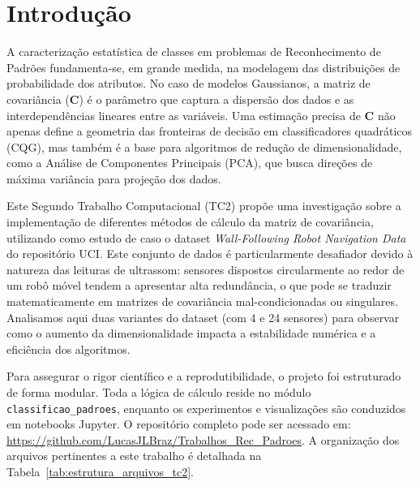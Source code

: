 \section{Introdução}
\label{cap:introducao}

A caracterização estatística de classes em problemas de Reconhecimento de Padrões fundamenta-se, em grande medida, na modelagem das distribuições de probabilidade dos atributos. No caso de modelos Gaussianos, a matriz de covariância ($\mathbf{C}$) é o parâmetro que captura a dispersão dos dados e as interdependências lineares entre as variáveis. Uma estimação precisa de $\mathbf{C}$ não apenas define a geometria das fronteiras de decisão em classificadores quadráticos (CQG), mas também é a base para algoritmos de redução de dimensionalidade, como a Análise de Componentes Principais (PCA), que busca direções de máxima variância para projeção dos dados.

Este Segundo Trabalho Computacional (TC2) propõe uma investigação sobre a implementação de diferentes métodos de cálculo da matriz de covariância, utilizando como estudo de caso o dataset \textit{Wall-Following Robot Navigation Data} do repositório UCI. Este conjunto de dados é particularmente desafiador devido à natureza das leituras de ultrassom: sensores dispostos circularmente ao redor de um robô móvel tendem a apresentar alta redundância, o que pode se traduzir matematicamente em matrizes de covariância mal-condicionadas ou singulares. Analisamos aqui duas variantes do dataset (com 4 e 24 sensores) para observar como o aumento da dimensionalidade impacta a estabilidade numérica e a eficiência dos algoritmos.

Para assegurar o rigor científico e a reprodutibilidade, o projeto foi estruturado de forma modular. Toda a lógica de cálculo reside no módulo \texttt{classificao\_padroes}, enquanto os experimentos e visualizações são conduzidos em notebooks Jupyter. O repositório completo pode ser acessado em: \url{https://github.com/LucasJLBraz/Trabalhos_Rec_Padroes}. A organização dos arquivos pertinentes a este trabalho é detalhada na Tabela~\ref{tab:estrutura_arquivos_tc2}.

\begin{table}[h!]
\centering
\caption{Estrutura de diretórios e arquivos para o Trabalho Computacional 2.}
\label{tab:estrutura_arquivos_tc2}
\end{table}
